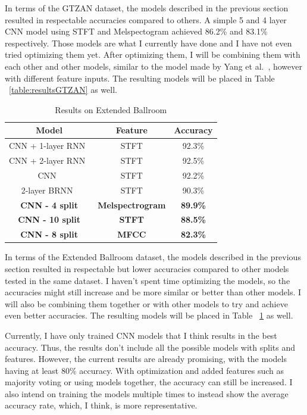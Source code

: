 \documentclass[10pt,twocolumn,letterpaper]{article}
\begin{document}
	In terms of the GTZAN dataset, the models described in the previous section resulted in respectable accuracies compared to others. A simple 5 and 4 layer CNN model using STFT and Melspectogram achieved 86.2\% and 83.1\% respectively. Those models are what I currently have done and I have not even tried optimizing them yet. After optimizing them, I will be combining them with each other and other models, similar to the model made by Yang et al.~\cite{yang2020parallel}, however with different feature inputs. The resulting models will be placed in Table ~\ref{table:resultsGTZAN} as well.
	
	\begin{table}[!htbp] %
		\caption{Results on Extended Ballroom}
		\centering
		\begin{tabular}[b]{ccc}
			\hline \hline
			Model & Feature & Accuracy 	\\ [0.5ex]
			\hline
			CNN + 1-layer RNN~\cite{yang2020parallel} & STFT & 92.3\%			\\
			CNN + 2-layer RNN~\cite{yang2020parallel} & STFT & 92.5\%			\\
			CNN~\cite{yang2020parallel} & STFT & 92.2\%							\\
			2-layer BRNN~\cite{schuster1997bidirectional} & STFT & 90.3\% 		\\
			\textbf{CNN - 4 split} & \textbf{Melspectrogram} & \textbf{89.9\%} 	\\
			\textbf{CNN - 10 split} & \textbf{STFT} & \textbf{88.5\%} 			\\
			\textbf{CNN - 8 split} & \textbf{MFCC} & \textbf{82.3\%} 			\\[1ex]
		\end{tabular}
	\label{table:resultsExtendedBallroom}
	\end{table}

	In terms of the Extended Ballroom dataset, the models described in the previous section resulted in respectable but lower accuracies compared to other models tested in the same dataset. I haven't spent time optimizing the models, so the accuracies might still increase and be more similar or better than other models. I will also be combining them together or with other models to try and achieve even better accuracies. The resulting models will be placed in Table ~\ref{table:resultsExtendedBallroom} as well.
	
	Currently, I have only trained CNN models that I think results in the best accuracy. Thus, the results don't include all the possible models with splits and features. However, the current results are already promising, with the models having at least 80\% accuracy. With optimization and added features such as majority voting or using models together, the accuracy can still be increased. I also intend on training the models multiple times to instead show the average accuracy rate, which, I think, is more representative. 
	
\end{document}
